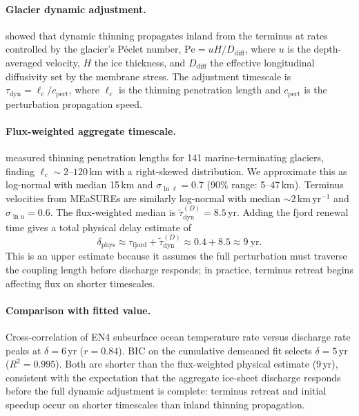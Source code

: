 \documentclass[11pt]{article}
\begin{document}
\paragraph{Glacier dynamic adjustment.}
\citet{Felikson2017} showed that dynamic thinning propagates inland from the terminus at rates controlled by the glacier's P\'{e}clet number, $\mathrm{Pe} = u H / D_{\mathrm{diff}}$, where $u$ is the depth-averaged velocity, $H$ the ice thickness, and $D_{\mathrm{diff}}$ the effective longitudinal diffusivity set by the membrane stress. The adjustment timescale is $\tau_{\mathrm{dyn}} = \ell_c / c_{\mathrm{pert}}$, where $\ell_c$ is the thinning penetration length and $c_{\mathrm{pert}}$ is the perturbation propagation speed.

\paragraph{Flux-weighted aggregate timescale.}
\citet{Felikson2017} measured thinning penetration lengths for 141 marine-terminating glaciers, finding $\ell_c \sim 2$--$120$\,km with a right-skewed distribution. We approximate this as log-normal with median 15\,km and $\sigma_{\ln \ell} = 0.7$ (90\% range: 5--47\,km). Terminus velocities from MEaSUREs \citep{Mouginot2019} are similarly log-normal with median $\sim$2\,km\,yr$^{-1}$ and $\sigma_{\ln u} = 0.6$. The flux-weighted median is $\tilde{\tau}_{\mathrm{dyn}}^{(D)} = 8.5$\,yr. Adding the fjord renewal time gives a total physical delay estimate of
\begin{equation}
	\delta_{\mathrm{phys}} \approx \tau_{\mathrm{fjord}} + \tilde{\tau}_{\mathrm{dyn}}^{(D)} \approx 0.4 + 8.5 \approx 9\ \mathrm{yr}.
\end{equation}
This is an upper estimate because it assumes the full perturbation must traverse the coupling length before discharge responds; in practice, terminus retreat begins affecting flux on shorter timescales.

\paragraph{Comparison with fitted value.}
Cross-correlation of EN4 subsurface ocean temperature rate versus \citet{Mouginot2019} discharge rate peaks at $\delta = 6$\,yr ($r = 0.84$). BIC on the cumulative demeaned fit selects $\delta = 5$\,yr ($R^2 = 0.995$). Both are shorter than the flux-weighted physical estimate (9\,yr), consistent with the expectation that the aggregate ice-sheet discharge responds before the full dynamic adjustment is complete: terminus retreat and initial speedup occur on shorter timescales than inland thinning propagation.
\end{document}
